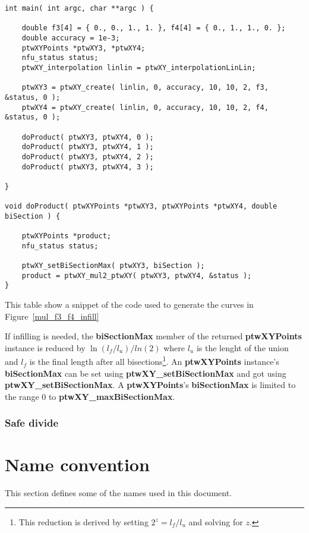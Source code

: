 \documentclass[11pt]{article}
\newcommand{\highlight}[1]{{\bf #1}}
\begin{document}
\begin{table}
\begin{verbatim}
int main( int argc, char **argc ) {

    double f3[4] = { 0., 0., 1., 1. }, f4[4] = { 0., 1., 1., 0. };
    double accuracy = 1e-3;
    ptwXYPoints *ptwXY3, *ptwXY4;
    nfu_status status;
    ptwXY_interpolation linlin = ptwXY_interpolationLinLin;

    ptwXY3 = ptwXY_create( linlin, 0, accuracy, 10, 10, 2, f3, &status, 0 );
    ptwXY4 = ptwXY_create( linlin, 0, accuracy, 10, 10, 2, f4, &status, 0 );

    doProduct( ptwXY3, ptwXY4, 0 );
    doProduct( ptwXY3, ptwXY4, 1 );
    doProduct( ptwXY3, ptwXY4, 2 );
    doProduct( ptwXY3, ptwXY4, 3 );

}

void doProduct( ptwXYPoints *ptwXY3, ptwXYPoints *ptwXY4, double biSection ) {

    ptwXYPoints *product;
    nfu_status status;

    ptwXY_setBiSectionMax( ptwXY3, biSection );
    product = ptwXY_mul2_ptwXY( ptwXY3, ptwXY4, &status );
}
\end{verbatim}
\caption{This table show a snippet of the code used to generate the curves in Figure~\ref{mul_f3_f4_infill}} \label{infillCode1}
\end{table}


If infilling is needed, the \highlight{biSectionMax} member of the returned \highlight{ptwXYPoints} instance is reduced by 
$\ln(l_f / l_u) / ln(2)$ where $l_u$ is the lenght of the union and $l_f$ is the final length after all bisections\footnote{This reduction is derived
by setting $2^z = l_f/l_u$ and solving for $z$.}. An \highlight{ptwXYPoints} instance's \highlight{biSectionMax} can be set using
\highlight{ptwXY\_setBiSectionMax} and got using \highlight{ptwXY\_setBiSectionMax}. A \highlight{ptwXYPoints}'s
\highlight{biSectionMax} is limited to the range 0 to \highlight{ptwXY\_maxBiSectionMax}.

\subsubsection{Safe divide}

\section{Name convention}

This section defines some of the names used in this document.
\end{document}
